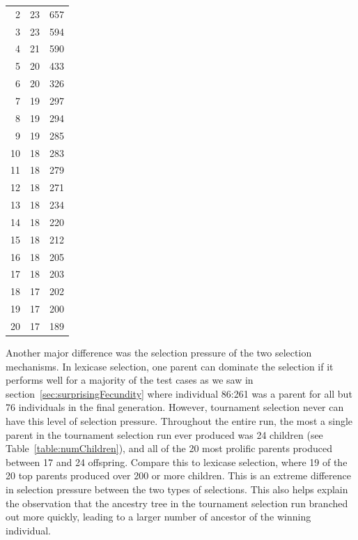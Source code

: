 \begin{table}
{\begin{tabular}{rrr}
			2 & 23 & 657 \\
			3 & 23 & 594 \\
			4 & 21 & 590 \\
			5 & 20 & 433 \\
			6 & 20 & 326 \\
			7 & 19 & 297 \\
			8 & 19 & 294 \\
			9 & 19 & 285 \\
			10 & 18 & 283 \\
			11 & 18 & 279 \\
			12 & 18 & 271 \\
			13 & 18 & 234 \\
			14 & 18 & 220 \\
			15 & 18 & 212 \\
			16 & 18 & 205 \\
			17 & 18 & 203 \\
			18 & 17 & 202 \\
			19 & 17 & 200 \\
			20 & 17 & 189 \\
		\end{tabular}
		}%
\end{table}

Another major difference was the selection pressure of the two selection mechanisms. In lexicase 
selection, one parent can dominate the selection if it performs well for a majority of the test 
cases as we saw in section~\ref{sec:surprisingFecundity} where individual 86:261 was a parent for 
all but 76 individuals in the final generation. However, tournament selection never 
can have this level of selection pressure. Throughout the entire run,
the most a single parent in the tournament selection run ever produced was 24 children 
(see Table~\ref{table:numChildren}), and all of the 20 most prolific parents produced between 17
and 24 offspring. Compare this to lexicase selection, where 19 of the 20 top parents produced over 
200 or more children. This is an extreme difference in selection pressure between the two types of 
selections. This also helps explain the observation that the ancestry tree in the tournament selection
run branched out more quickly, leading to a larger number of ancestor of the winning individual. 

